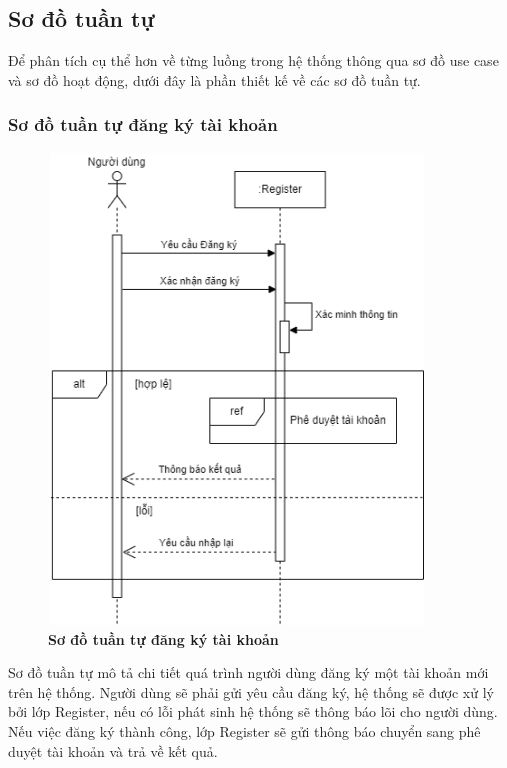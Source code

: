 \subsection{Sơ đồ tuần tự}
Để phân tích cụ thể hơn về từng luồng trong hệ thống thông qua sơ đồ use case và sơ đồ hoạt động, dưới đây là phần thiết kế
 về các sơ đồ tuần tự.

\subsubsection{Sơ đồ tuần tự đăng ký tài khoản}
\begin{figure}[H]
  \centering
  \includegraphics[width=10cm,height=12.5cm]{Images/sequence/sequence_register.png}
  \caption[Sơ đồ tuần tự đăng ký tài khoản]{\bfseries \fontsize{12pt}{0pt}
  \selectfont Sơ đồ tuần tự đăng ký tài khoản}
  \label{sequence_register} %
\end{figure}
Sơ đồ tuần tự mô tả chi tiết quá trình người dùng đăng ký một tài khoản mới trên hệ thống. Người dùng sẽ phải gửi yêu cầu đăng ký, hệ thống sẽ được xử lý
bởi lớp Register, nếu có lỗi phát sinh hệ thống sẽ thông báo lõi cho người dùng. Nếu việc đăng ký thành công, lớp Register sẽ gửi thông báo 
chuyển sang phê duyệt tài khoản và trả về kết quả.  

